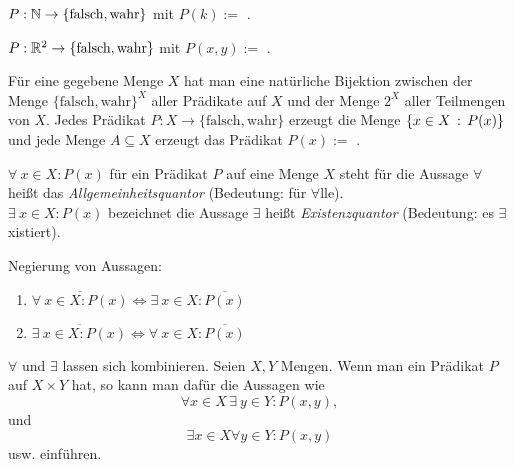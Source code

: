 \begin{bsp}
$ P : \mathbb{N} \to \{ \text{falsch},\text{wahr} \}$ mit $P(k) := $ .
\end{bsp} 

\begin{bsp}
$ P : \mathbb{R}^2 \to \{ \text{falsch},\text{wahr} \}$ mit $P(x,y) := $ .
\end{bsp} 

\begin{bem} 
	Für eine gegebene Menge $X$ hat man eine natürliche Bijektion zwischen der Menge $ \{ \text{falsch},\text{wahr} \}^X$ aller Prädikate auf $X$ und der Menge $2^X$ aller Teilmengen von $X$. Jedes Prädikat $P : X \to \{ \text{falsch},\text{wahr} \}$ erzeugt die Menge $\left\{ x \in X  \,:\, P(x) \right\}$ und jede Menge $A \subseteq X$ erzeugt das Prädikat $P (x) :=$ .
\end{bem} 


\begin{defn}
$ \forall\: x \in X : P(x) $ für ein Prädikat $ P $ auf eine Menge $ X $ steht für die Aussage  $ \forall $ heißt das \emph{Allgemeinheitsquantor} (Bedeutung: für $ \forall $lle). \\[10pt]
%
$ \exists\: x \in X : P(x) $ bezeichnet die Aussage  $ \exists $ heißt \emph{Existenzquantor} (Bedeutung: es $ \exists $xistiert).
\end{defn}

\begin{bem}
	Negierung von Aussagen:
	\begin{enumerate}
		\item $ \overline{\forall\: x \in X : P(x)} \Leftrightarrow \exists\: x \in X : \overline{P(x)} $
		\item $ \overline{\exists\: x \in X : P(x)} \Leftrightarrow \forall\: x \in X : \overline{P(x)} $
	\end{enumerate}
\end{bem}


\begin{bem}
	$ \forall $ und $ \exists $ lassen sich kombinieren. Seien $X, Y$ Mengen. Wenn man ein Prädikat $ P $ auf $ X \times Y $ hat, so kann man dafür die Aussagen wie 
	\[
		 \forall x \in X \,\exists\: y \in Y : P(x,y), 
	\]
	und
	\[\exists x \in X  \forall y \in Y : P(x,y) 
	\]
	usw. einführen. 
\end{bem}


